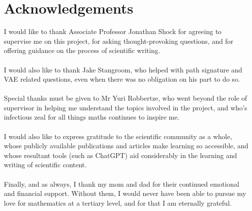 \documentclass{article}
\theoremstyle{definition}
\begin{document}
\section{Acknowledgements}
I would like to thank Associate Professor Jonathan Shock for agreeing to supervise me on this project, for asking thought-provoking questions, and for offering guidance on the process of scientific writing.\\\\
I would also like to thank Jake Stangroom, who helped with path signature and VAE related questions, even when there was no obligation on his part to do so.\\\\
Special thanks must be given to Mr Yuri Robbertze, who went beyond the role of supervisor in helping me understand the topics involved in the project, and who's infectious zeal for all things maths continues to inspire me. \\\\
I would also like to express gratitude to the scientific community as a whole, whose publicly available publications and articles make learning so accessible, and whose resultant tools (such as ChatGPT) aid considerably in the learning and writing of scientific content.\\\\ 
Finally, and as always, I thank my mom and dad for their continued emotional and financial support. Without them, I would never have been able to pursue my love for mathematics at a tertiary level, and for that I am eternally grateful. 
\newpage
\end{document}
